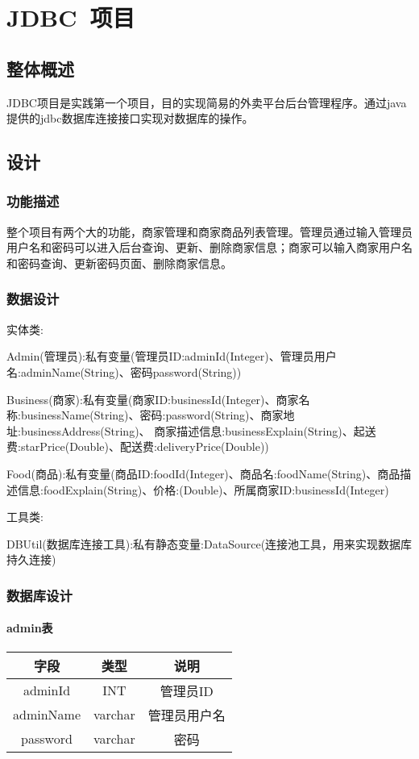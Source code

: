 \chapter{JDBC~项目}

\section{整体概述}
JDBC项目是实践第一个项目，目的实现简易的外卖平台后台管理程序。通过java提供的jdbc数据库连接接口实现对数据库的操作。

\section{设计}
\subsection{功能描述}
整个项目有两个大的功能，商家管理和商家商品列表管理。管理员通过输入管理员用户名和密码可以进入后台查询、更新、删除商家信息；商家可以输入商家用户名和密码查询、更新密码页面、删除商家信息。

\subsection{数据设计}
实体类:

Admin(管理员):私有变量(管理员ID:adminId(Integer)、管理员用户名:adminName(String)、密码password(String))

Business(商家):私有变量(商家ID:businessId(Integer)、商家名称:businessName(String)、密码:password(String)、商家地址:businessAddress(String)、
商家描述信息:businessExplain(String)、起送费:starPrice(Double)、配送费:deliveryPrice(Double))

Food(商品):私有变量(商品ID:foodId(Integer)、商品名:foodName(String)、商品描述信息:foodExplain(String)、价格:(Double)、所属商家ID:businessId(Integer)

工具类:

DBUtil(数据库连接工具):私有静态变量:DataSource(连接池工具，用来实现数据库持久连接)

\subsection{数据库设计}
\subsubsection{admin表}
    \begin{tabular}{c|c|c}
    	\hline
    	字段 & 类型 & 说明 \\
    	\hline
    	adminId & INT & 管理员ID \\
    	\hline
    	adminName & varchar & 管理员用户名 \\
    	\hline
    	password & varchar & 密码 \\
    \end{tabular}
    
